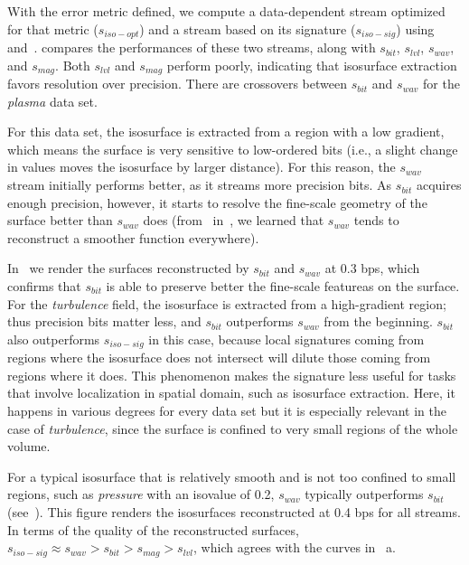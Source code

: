 With the error metric defined, we compute a data-dependent stream optimized for that metric
($s_{iso-opt}$) and a stream based on its signature ($s_{iso-sig}$) using~
and~.  compares the performances of these two
streams, along with $s_{bit}$, $s_{lvl}$, $s_{wav}$, and $s_{mag}$. Both $s_{lvl}$ and $s_{mag}$
perform poorly, indicating that isosurface extraction favors resolution over precision. There are
crossovers between $s_{bit}$ and $s_{wav}$ for the \emph{plasma} data set.

For this data set, the isosurface is extracted from a region with a low gradient, which means the
surface is very sensitive to low-ordered bits (i.e., a slight change in values moves the isosurface
by larger distance). For this reason, the $s_{wav}$ stream initially performs better, as it streams
more precision bits. As $s_{bit}$ acquires enough precision, however, it starts to resolve the
fine-scale geometry of the surface better than $s_{wav}$ does
(from~ in~, we learned that
$s_{wav}$ tends to reconstruct a smoother function everywhere).

In~ we render the surfaces reconstructed by $s_{bit}$ and
$s_{wav}$ at 0.3 bps, which confirms that $s_{bit}$ is able to preserve better the fine-scale
featureas on the surface. For the \emph{turbulence} field, the isosurface is extracted from a
high-gradient region; thus precision bits matter less, and $s_{bit}$ outperforms $s_{wav}$ from the
beginning. $s_{bit}$ also outperforms $s_{iso-sig}$ in this case, because local signatures coming
from regions where the isosurface does not intersect will dilute those coming from regions where it
does. This phenomenon makes the signature less useful for tasks that involve localization in spatial
domain, such as isosurface extraction. Here, it happens in various degrees for every data set but it
is especially relevant in the case of \emph{turbulence}, since the surface is confined to very small
regions of the whole volume.

For a typical isosurface that is relatively smooth and is not too confined to small regions, such as
\emph{pressure} with an isovalue of 0.2, $s_{wav}$ typically outperforms $s_{bit}$
(see~). This figure renders the isosurfaces reconstructed at
0.4 bps for all streams. In terms of the quality of the reconstructed surfaces, $s_{iso-sig} \approx
s_{wav} > s_{bit} > s_{mag} > s_{lvl}$, which agrees with the curves in
~a. 
